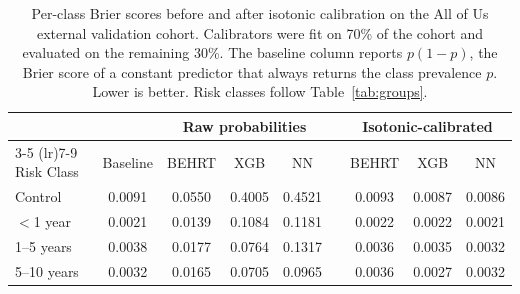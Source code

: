 \documentclass[12pt]{article}
\begin{document}
\begin{table}[H]
\centering
\caption{Per-class Brier scores before and after isotonic calibration on the All of Us external validation cohort. Calibrators were fit on 70\% of the cohort and evaluated on the remaining 30\%. The baseline column reports $p(1-p)$, the Brier score of a constant predictor that always returns the class prevalence $p$. Lower is better. Risk classes follow Table~\ref{tab:groups}.}
\label{tab:aou_brier_calibration_comparison}
\begin{tabular}{lcccccccc}
\toprule
 & & \multicolumn{3}{c}{Raw probabilities} & & \multicolumn{3}{c}{Isotonic-calibrated} \\
\cmidrule(lr){3-5} \cmidrule(lr){7-9}
Risk Class & Baseline & BEHRT & XGB & NN & & BEHRT & XGB & NN \\
\midrule
Control     & 0.0091 & 0.0550 & 0.4005 & 0.4521 & & 0.0093 & 0.0087 & 0.0086 \\
$<$1 year   & 0.0021 & 0.0139 & 0.1084 & 0.1181 & & 0.0022 & 0.0022 & 0.0021 \\
1--5 years  & 0.0038 & 0.0177 & 0.0764 & 0.1317 & & 0.0036 & 0.0035 & 0.0032 \\
5--10 years & 0.0032 & 0.0165 & 0.0705 & 0.0965 & & 0.0036 & 0.0027 & 0.0032 \\
\bottomrule
\end{tabular}
\end{table}
\end{document}
